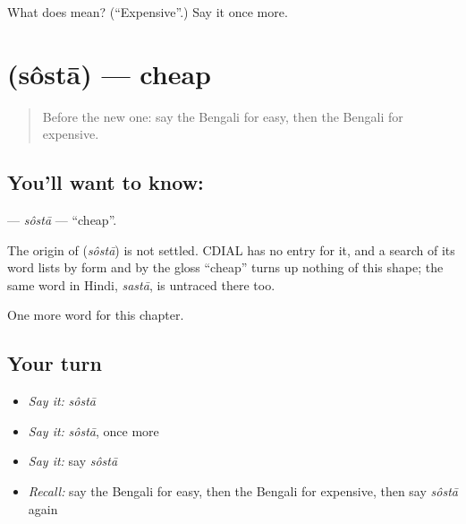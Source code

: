 \begin{tcolorbox}[breakable,colback=teal!4,colframe=teal!35!black,title={Before you move on}]
What does  mean? (\textquotedblleft{}Expensive\textquotedblright{}.) Say it once more.
\end{tcolorbox}
\section[\texorpdfstring{\bn{সস্তা} (sôstā)}{সস্তা (sôstā)}]{ (sôstā) — cheap}

\label{lesson:BN-C74-sosta}



\begin{quote}
Before the new one: say the Bengali for easy, then the Bengali for expensive.
\end{quote}

\subsection*{You'll want to know: }
\textbf{} — \emph{sôstā} — \textquotedblleft{}cheap\textquotedblright{}.

\begin{cousinweb}
The origin of \textbf{} (\emph{sôstā}) is not settled. CDIAL has no entry for it, and a search of its word lists by form and by the gloss \textquotedblleft{}cheap\textquotedblright{} turns up nothing of this shape; the same word in Hindi, \emph{sastā}, is untraced there too.
\end{cousinweb}

\begin{grammarlens}[title={What you've built}]
One more word for this chapter.
\end{grammarlens}

\subsection*{Your turn}
\begin{itemize}
\raggedright
  \item \emph{Say it:} \emph{sôstā}
  \item \emph{Say it:} \emph{sôstā}, once more
  \item \emph{Say it:} say \emph{sôstā}
  \item \emph{Recall:} say the Bengali for easy, then the Bengali for expensive, then say \emph{sôstā} again
\end{itemize}

